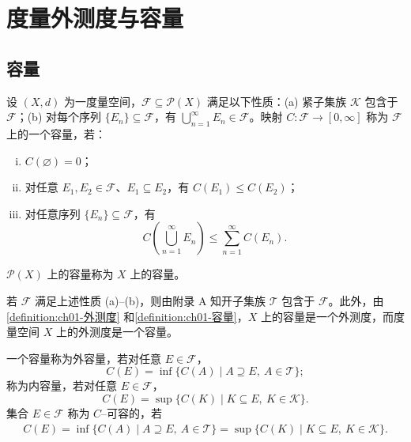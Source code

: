 \documentclass[../../main.tex]{subfiles}%
\begin{document}
\section{度量外测度与容量}\label{section:ch01-度量外测度容量}

\subsection{容量}\label{subsection:ch01-容量}

\begin{definition}\label{definition:ch01-容量}
设 $(X,d)$ 为一度量空间，$\mathcal{F}\subseteq\mathcal{P}(X)$ 满足以下性质：(a) 紧子集族 $\mathcal{K}$ 包含于 $\mathcal{F}$；(b) 对每个序列 $\{E_n\}\subseteq\mathcal{F}$，有 $\bigcup_{n=1}^\infty E_n\in\mathcal{F}$。映射 $C:\mathcal{F}\to[0,\infty]$ 称为 $\mathcal{F}$ 上的一个容量，若：
\begin{enumerate}[(i)]
\item $C(\varnothing )=0$；
\item 对任意 $E_1,E_2\in\mathcal{F}$、$E_1\subseteq E_2$，有 $C(E_1)\leqslant C(E_2)$；
\item 对任意序列 $\{E_n\}\subseteq\mathcal{F}$，有
\[
C\left(\bigcup_{n=1}^\infty E_n\right)\leqslant\sum_{n=1}^\infty C(E_n).
\]
\end{enumerate}
$\mathcal{P}(X)$ 上的容量称为 $X$ 上的容量。
\end{definition}

\begin{remark}\label{remark:ch01-容量与外测度}
若 $\mathcal{F}$ 满足上述性质 (a)--(b)，则由附录 A 知开子集族 $\mathcal{T}$ 包含于 $\mathcal{F}$。此外，由\cref{definition:ch01-外测度} 和\cref{definition:ch01-容量}，$X$ 上的容量是一个外测度，而度量空间 $X$ 上的外测度是一个容量。
\end{remark}

\begin{definition}\label{definition:ch01-内外容量}
一个容量称为外容量，若对任意 $E\in\mathcal{F}$，
\[
C(E)=\inf\{C(A)\mid A\supseteq E,\ A\in\mathcal{T}\};
\]
称为内容量，若对任意 $E\in\mathcal{F}$，
\[
C(E)=\sup\{C(K)\mid K\subseteq E,\ K\in\mathcal{K}\}.
\]
集合 $E\in\mathcal{F}$ 称为 $C$--可容的，若
\begin{align}
C(E)=\inf\{C(A)\mid A\supseteq E,\ A\in\mathcal{T}\}=\sup\{C(K)\mid K\subseteq E,\ K\in\mathcal{K}\}. \label{align:ch01-可容}
\end{align}
\end{definition}
\end{document}
